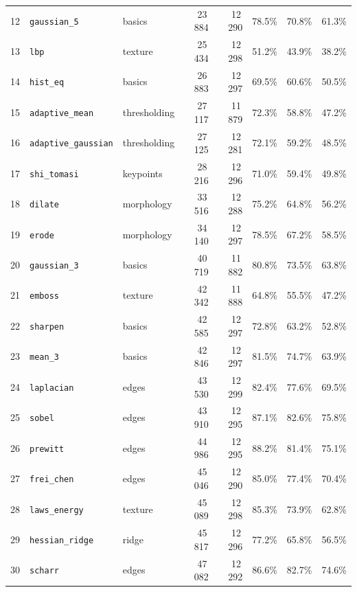 \documentclass[a4paper,12pt]{article}
\begin{document}
\begin{longtable}{@{}r l l r r c c c@{}}
	12 & \texttt{gaussian\_5}        & basics      & 23\,884  & 12\,290 & 78.5\% & 70.8\% & 61.3\% \\
	13 & \texttt{lbp}                & texture     & 25\,434  & 12\,298 & 51.2\% & 43.9\% & 38.2\% \\
	14 & \texttt{hist\_eq}           & basics      & 26\,883  & 12\,297 & 69.5\% & 60.6\% & 50.5\% \\
	15 & \texttt{adaptive\_mean}     & thresholding& 27\,117  & 11\,879 & 72.3\% & 58.8\% & 47.2\% \\
	16 & \texttt{adaptive\_gaussian} & thresholding& 27\,125  & 12\,281 & 72.1\% & 59.2\% & 48.5\% \\
	17 & \texttt{shi\_tomasi}        & keypoints   & 28\,216  & 12\,296 & 71.0\% & 59.4\% & 49.8\% \\
	18 & \texttt{dilate}             & morphology  & 33\,516  & 12\,288 & 75.2\% & 64.8\% & 56.2\% \\
	19 & \texttt{erode}              & morphology  & 34\,140  & 12\,297 & 78.5\% & 67.2\% & 58.5\% \\
	20 & \texttt{gaussian\_3}        & basics      & 40\,719  & 11\,882 & 80.8\% & 73.5\% & 63.8\% \\
	21 & \texttt{emboss}             & texture     & 42\,342  & 11\,888 & 64.8\% & 55.5\% & 47.2\% \\
	22 & \texttt{sharpen}            & basics      & 42\,585  & 12\,297 & 72.8\% & 63.2\% & 52.8\% \\
	23 & \texttt{mean\_3}            & basics      & 42\,846  & 12\,297 & 81.5\% & 74.7\% & 63.9\% \\
	24 & \texttt{laplacian}          & edges       & 43\,530  & 12\,299 & 82.4\% & 77.6\% & 69.5\% \\
	25 & \texttt{sobel}              & edges       & 43\,910  & 12\,295 & 87.1\% & 82.6\% & 75.8\% \\
	26 & \texttt{prewitt}            & edges       & 44\,986  & 12\,295 & 88.2\% & 81.4\% & 75.1\% \\
	27 & \texttt{frei\_chen}         & edges       & 45\,046  & 12\,290 & 85.0\% & 77.4\% & 70.4\% \\
	28 & \texttt{laws\_energy}       & texture     & 45\,089  & 12\,298 & 85.3\% & 73.9\% & 62.8\% \\
	29 & \texttt{hessian\_ridge}     & ridge       & 45\,817  & 12\,296 & 77.2\% & 65.8\% & 56.5\% \\
	30 & \texttt{scharr}             & edges       & 47\,082  & 12\,292 & 86.6\% & 82.7\% & 74.6\% \\

\end{longtable}
\end{document}

